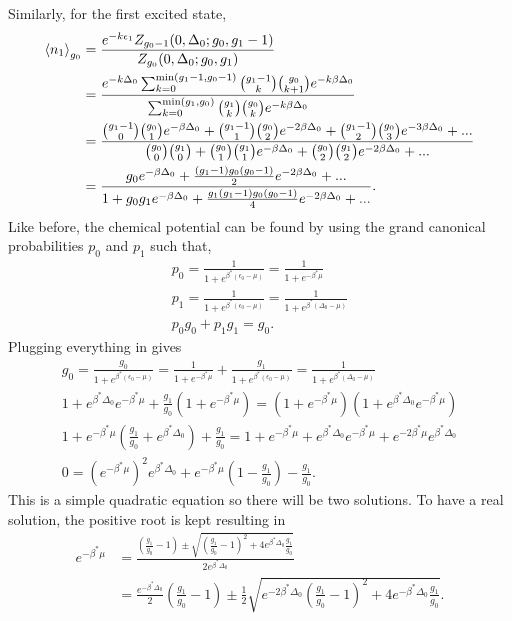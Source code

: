 Similarly, for the first excited state,
\begin{align}
    \left<{n_1}\right>_{g_0}&=\frac{e^{-k\epsilon_1} Z_{g_0-1}(0,\Delta_0;g_0,g_1-1)}{Z_{g_0}(0,\Delta_0;g_0,g_1)}\nonumber\\
    &=\frac{e^{-k\Delta_0}\sum_{k=0}^{\text{min}(g_1-1,g_0-1)} {g_1-1\choose k}{g_0 \choose k+1} e^{-k\beta\Delta_0}}{\sum_{k=0}^{\text{min}(g_1,g_0)} {g_1\choose k}{g_0 \choose k} e^{-k\beta\Delta_0}}\nonumber\\
    &=\frac{{g_1-1\choose 0}{g_0\choose 1} e^{-\beta\Delta_0} +{g_1-1\choose 1}{g_0\choose 2} e^{-2\beta\Delta_0}+{g_1-1\choose 2}{g_0\choose 3}e^{-3\beta\Delta_0}+...}{{g_0\choose 0}{g_1\choose 0}+{g_0\choose 1}{g_1\choose 1}e^{-\beta\Delta_0}+{g_0\choose 2}{g_1\choose 2}e^{-2\beta\Delta_0}+...}\nonumber\\
    &=\frac{g_0e^{-\beta\Delta_0}+\frac{(g_1-1)g_0(g_0-1)}{2}e^{-2\beta\Delta_0}+...}{1+g_0g_1 e^{-\beta\Delta_0}+\frac{g_1(g_1-1)g_0(g_0-1)}{4}e^{-2\beta\Delta_0}+...}.
\end{align} 
Like before, the chemical potential can be found by using the grand canonical probabilities $p_0$ and $p_1$ such that,
\begin{gather}
    p_0=\frac{1}{1+e^{\beta^*(\epsilon_0-\mu)}}=\frac{1}{1+e^{-\beta^* \mu}}\\
    p_1=\frac{1}{1+e^{\beta^*(\epsilon_0-\mu)}}=\frac{1}{1+e^{\beta^*(\Delta_0-\mu)}}\\
    p_0g_0+p_1g_1=g_0.
\end{gather}
Plugging everything in gives
\begin{gather}
    g_0=\frac{g_0}{1+e^{\beta^*(\epsilon_0-\mu)}}=\frac{1}{1+e^{-\beta^*\mu}}+\frac{g_1}{1+e^{\beta^*(\epsilon_0-\mu)}}=\frac{1}{1+e^{\beta^*(\Delta_0-\mu)}}\nonumber\\
    1+e^{\beta^*\Delta_0} e^{-\beta^*\mu}+\frac{g_1}{g_0}(1+e^{-\beta^*\mu})=(1+e^{-\beta^*\mu})(1+e^{\beta^*\Delta_0} e^{-\beta^* \mu})\nonumber\\
    1+e^{-\beta^*\mu}(\frac{g_1}{g_0}+e^{\beta^*\Delta_0})+\frac{g_1}{g_0}=1+e^{-\beta^*\mu}+e^{\beta^*\Delta_0}e^{-\beta^*\mu}+e^{-2\beta^*\mu}e^{\beta^*\Delta_0}\nonumber\\
    0=(e^{-\beta^*\mu})^2 e^{\beta^*\Delta_0} +e ^{-\beta^*\mu}(1-\frac{g_1}{g_0})-\frac{g_1}{g_0}.
\end{gather}
This is a simple quadratic equation so there will be two solutions. To have a real solution, the positive root is kept resulting in
\begin{align}
    e^{-\beta^*\mu}&=\frac{(\frac{g_1}{g_0}-1)\pm\sqrt{(\frac{g_1}{g_0}-1)^2+4e^{\beta^*\Delta_0}\frac{g_1}{g_0}}}{2e^{\beta^*\Delta_0}}\nonumber\\
    &=\frac{e^{-\beta^*\Delta_0}}{2}(\frac{g_1}{g_0}-1)\pm \frac{1}{2}\sqrt{e^{-2\beta^*\Delta_0} (\frac{g_1}{g_0}-1)^2+ 4e^{-\beta^*\Delta_0}\frac{g_1}{g_0}}.
\end{align}
